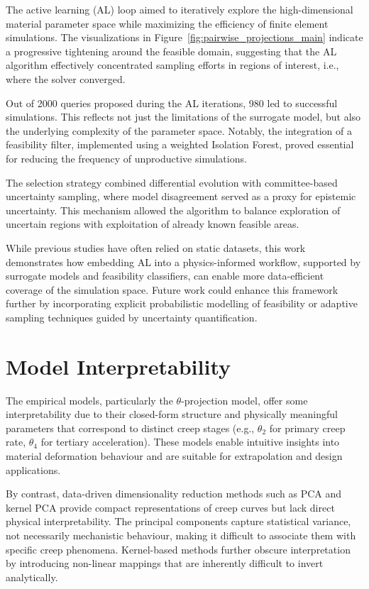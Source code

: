 \documentclass[class=scrbook, crop=false]{standalone}
\begin{document}
The active learning (AL) loop aimed to iteratively explore the high-dimensional material parameter space while maximizing the efficiency of finite element simulations. The visualizations in Figure~\ref{fig:pairwise_projections_main} indicate a progressive tightening around the feasible domain, suggesting that the AL algorithm effectively concentrated sampling efforts in regions of interest, i.e., where the solver converged.

Out of 2000 queries proposed during the AL iterations, 980 led to successful simulations. This reflects not just the limitations of the surrogate model, but also the underlying complexity of the parameter space. Notably, the integration of a feasibility filter, implemented using a weighted Isolation Forest, proved essential for reducing the frequency of unproductive simulations. 

The selection strategy combined differential evolution with committee-based uncertainty sampling, where model disagreement served as a proxy for epistemic uncertainty. This mechanism allowed the algorithm to balance exploration of uncertain regions with exploitation of already known feasible areas.

While previous studies have often relied on static datasets, this work demonstrates how embedding AL into a physics-informed workflow, supported by surrogate models and feasibility classifiers, can enable more data-efficient coverage of the simulation space. Future work could enhance this framework further by incorporating explicit probabilistic modelling of feasibility or adaptive sampling techniques guided by uncertainty quantification.

\section{Model Interpretability}
\label{Section::Discussion_Interpretability}

The empirical models, particularly the $\theta$-projection model, offer some interpretability due to their closed-form structure and physically meaningful parameters that correspond to distinct creep stages (e.g., $\theta_2$ for primary creep rate, $\theta_4$ for tertiary acceleration). These models enable intuitive insights into material deformation behaviour and are suitable for extrapolation and design applications.

By contrast, data-driven dimensionality reduction methods such as PCA and kernel PCA provide compact representations of creep curves but lack direct physical interpretability. The principal components capture statistical variance, not necessarily mechanistic behaviour, making it difficult to associate them with specific creep phenomena. Kernel-based methods further obscure interpretation by introducing non-linear mappings that are inherently difficult to invert analytically.
\end{document}

